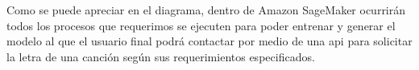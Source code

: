 \documentclass[12pt, a4paper, titlepage]{report}
\begin{document}
	Como se puede apreciar en el diagrama, dentro de Amazon SageMaker ocurrirán todos los procesos que requerimos se ejecuten para poder entrenar y generar el modelo al que el usuario final podrá contactar por medio de una \acrshort{api} para solicitar la letra de una canción según sus requerimientos especificados.

	
\end{document}
